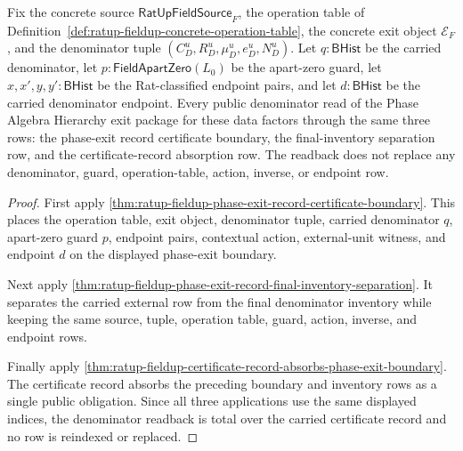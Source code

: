 \begin{theorem}
\label{thm:ratup-fieldup-phase-exit-denominator-total-readback}
Fix the concrete source $\mathsf{RatUpFieldSource}_F$, the operation table of
Definition~\ref{def:ratup-fieldup-concrete-operation-table}, the concrete
exit object $\mathcal E_F$, and the denominator tuple
$(C_D^u,R_D^u,\mu_D^u,e_D^u,N_D^u)$. Let $q:\mathsf{BHist}$ be the carried
denominator, let $p:\mathsf{FieldApartZero}(L_0)$ be the apart-zero guard,
let $x,x',y,y':\mathsf{BHist}$ be the Rat-classified endpoint pairs, and let
$d:\mathsf{BHist}$ be the carried denominator endpoint. Every public
denominator read of the Phase Algebra Hierarchy exit package for these data
factors through the same three rows: the phase-exit record certificate
boundary, the final-inventory separation row, and the certificate-record
absorption row. The readback does not replace any denominator, guard,
operation-table, action, inverse, or endpoint row.
\end{theorem}
\begin{proof}
First apply
\autoref{thm:ratup-fieldup-phase-exit-record-certificate-boundary}. This
places the operation table, exit object, denominator tuple, carried
denominator $q$, apart-zero guard $p$, endpoint pairs, contextual action,
external-unit witness, and endpoint $d$ on the displayed phase-exit boundary.

Next apply
\autoref{thm:ratup-fieldup-phase-exit-record-final-inventory-separation}. It
separates the carried external row from the final denominator inventory while
keeping the same source, tuple, operation table, guard, action, inverse, and
endpoint rows.

Finally apply
\autoref{thm:ratup-fieldup-certificate-record-absorbs-phase-exit-boundary}.
The certificate record absorbs the preceding boundary and inventory rows as a
single public obligation. Since all three applications use the same displayed
indices, the denominator readback is total over the carried certificate record
and no row is reindexed or replaced.
\end{proof}

